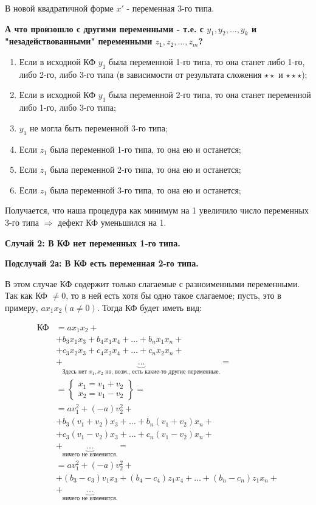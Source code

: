 В новой квадратичной форме $x'$ - переменная 3-го типа.

\textbf{А что произошло с другими переменными - т.е. с $y_1, y_2, \ldots, y_k$ и "незадействованными" переменными $z_1, z_2, \ldots, z_m$?}

\begin{enumerate}
    \item Если в исходной КФ $y_1$ была переменной 1-го типа, то она станет либо 1-го, либо 2-го, либо 3-го типа (в зависимости от результата сложения $\star\star$ и $\star\star\star$);
    \item Если в исходной КФ $y_1$ была переменной 2-го типа, то она станет переменной либо 1-го, либо 3-го типа;
    \item $y_1$ не могла быть переменной 3-го типа;
    \item Если $z_1$ была переменной 1-го типа, то она ею и останется;
    \item Если $z_1$ была переменной 2-го типа, то она ею и останется;
    \item Если $z_1$ была переменной 3-го типа, то она ею и останется;
\end{enumerate}

Получается, что наша процедура как минимум на 1 увеличило число переменных 3-го типа $\Rightarrow$ дефект КФ уменьшился на 1.

\bigbreak

\textbf{Случай 2: В КФ нет переменных 1-го типа.} 

\bigbreak

\textbf{Подслучай 2а: В КФ есть переменная 2-го типа.}

В этом случае КФ содержит только слагаемые с разноименными переменными. Так как КФ $\ne 0$, то в ней есть хотя бы одно такое слагаемое; пусть, это в примеру, $ax_1x_2 (a \ne 0)$. Тогда КФ будет иметь вид:

\begin{align*}
    \text{КФ} &= ax_1x_2 + \\
    &+ b_3x_1x_3 + b_4x_1x_4 + \ldots + b_nx_1x_n + \\
    &+ c_3x_2x_3 + c_4x_2x_4 + \ldots + c_nx_2x_n + \\
    &+ \underbrace{\ldots}_{\text{Здесь нет }x_1, x_2\text{ но, возм., есть какие-то другие переменные.}} = \\
    &= \left\{\begin{array}{c}
        x_1 = v_1 + v_2 \\
        x_2 = v_1 - v_2 
    \end{array}\right\} = \\
    &= av^2_1 + (-a)v^2_2 + \\
    &+ b_3(v_1 + v_2)x_3 + \ldots + b_n(v_1 + v_2)x_n + \\
    &+ c_3(v_1 - v_2)x_3 + \ldots + c_n(v_1 - v_2)x_n + \\
    & + \underbrace{\ldots}_{\text{ничего не изменится.}} = \\
    &= av^2_1 + (-a)v^2_2 + \\
    &+ (b_3 - c_3)v_1x_3 + (b_4 - c_4)z_1x_4 + \ldots + (b_n - c_n)z_1x_n + \\ &+ \underbrace{\ldots}_{\text{ничего не изменится.}}
\end{align*}


